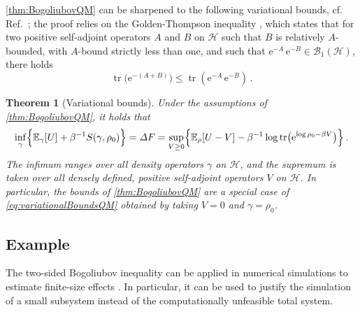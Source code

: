 \documentclass[a4paper, twoside, 11pt, reqno]{amsart}
\theoremstyle{definition}
\theoremstyle{plain}
\newtheorem{theorem}[definition]{Theorem}
\renewcommand{\Delta}{\varDelta}
\newcommand{\MH}{\mathcal{H}}
\newcommand{\ee}{\mathrm{e}}
\newcommand{\BO}{\mathscr{B}}
\newcommand{\NO}{\BO_1}
\newcommand{\1}{\mathbf{1}}
\newcommand{\EV}{\mathbb{E}}
\DeclareMathOperator{\tr}{tr}
\newcommand{\inv}[1]{#1^{-1}}
\begin{document}
\cref{thm:BogoliubovQM} can be sharpened to the following variational bounds, cf. Ref.~\cite[Cor. 4.5]{Reible2022}; the proof relies on the Golden-Thompson inequality \cite[Thm. 1]{BreiteneckerGruemm1972}, which states that for two positive self-adjoint operators $A$ and $B$ on $\MH$ such that $B$ is relatively $A$-bounded, with $A$-bound strictly less than one, and such that $\ee^{-A} \, \ee^{-B} \in \NO(\MH)$, there holds
\begin{equation*}
    \tr\bigl(\ee^{- (A + B)}\bigr) \le \tr(\ee^{-A} \, \ee^{-B}) \, .
\end{equation*}

\begin{theorem}[Variational bounds]\label{thm:variationalBoundsQM}
    Under the assumptions of \cref{thm:BogoliubovQM}, it holds that
    \begin{equation}\label{eq:variationalBoundsQM}
        \inf_{\gamma} \Bigl\{\EV_\gamma[U] + \inv{\beta} S(\gamma, \rho_0)\Bigr\} = \Delta F = \sup_{V \ge 0} \Bigl\{\EV_\rho[U - V] - \inv{\beta} \log \tr\bigl(\ee^{\log \rho_0 - \beta V}\bigr)\Bigr\} \, .
    \end{equation}
    The infimum ranges over all density operators $\gamma$ on $\MH$, and the supremum is taken over all densely defined, positive self-adjoint operators $V$ on $\MH$. In particular, the bounds of \cref{thm:BogoliubovQM} are a special case of \eqref{eq:variationalBoundsQM} obtained by taking $V = 0$ and $\gamma = \rho_0$.
\end{theorem}
        

\subsection{Example}

The two-sided Bogoliubov inequality can be applied in numerical simulations to estimate finite-size effects \cite{Reible2022, Reible2025apx, Reible2023, Reible2025camcos}. In particular, it can be used to justify the simulation of a small subsystem instead of the computationally unfeasible total system.
\end{document}
